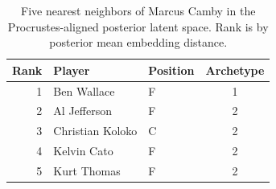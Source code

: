 \begin{table}[htbp]
  \centering\small
  \begin{tabular}{rllc}
    \toprule
    Rank & Player & Position & Archetype \\
    \midrule
    1 & Ben Wallace & F & 1 \\
    2 & Al Jefferson & F & 2 \\
    3 & Christian Koloko & C & 2 \\
    4 & Kelvin Cato & F & 2 \\
    5 & Kurt Thomas & F & 2 \\
    \bottomrule
  \end{tabular}
  \caption{Five nearest neighbors of Marcus Camby in the Procrustes-aligned posterior latent space. Rank is by posterior mean embedding distance.}
  \label{tab:Marcus_Camby_neighbors}
\end{table}

